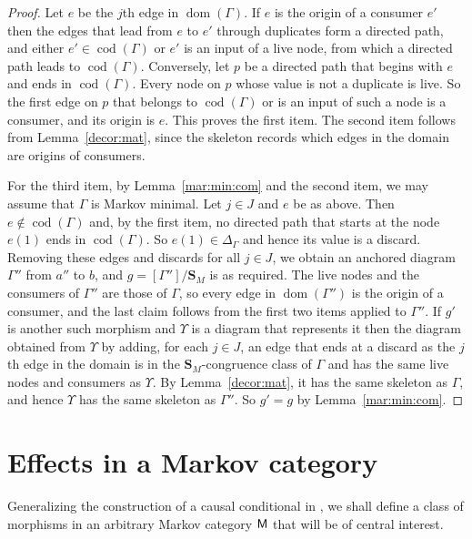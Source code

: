 \documentclass[12pt]{amsart}
\theoremstyle{plain}
\theoremstyle{definition}
\theoremstyle{remark}
\numberwithin{equation}{section}
\theoremstyle{plain}
\DeclareMathOperator{\dom}{dom}
\DeclareMathOperator{\cod}{cod}
\newcommand{\0}{\emptyset}
\newcommand{\cat}[1]{\textup{\textsf{#1}}}
\begin{document}
\begin{proof}
Let $e$ be the $j$th edge in $\dom(\Gamma)$. If $e$ is the origin of a consumer $e'$ then the edges that lead from $e$ to $e'$ through duplicates form a directed path, and either $e' \in \cod(\Gamma)$ or $e'$ is an input of a live node, from which a directed path leads to $\cod(\Gamma)$. Conversely, let $p$ be a directed path that begins with $e$ and ends in $\cod(\Gamma)$. Every node on $p$ whose value is not a duplicate is live. So the first edge on $p$ that belongs to $\cod(\Gamma)$ or is an input of such a node is a consumer, and its origin is $e$. This proves the first item. The second item follows from Lemma~\ref{decor:mat}, since the skeleton records which edges in the domain are origins of consumers.

For the third item, by Lemma~\ref{mar:min:com} and the second item, we may assume that $\Gamma$ is Markov minimal. Let $j \in J$ and $e$ be as above. Then $e \notin \cod(\Gamma)$ and, by the first item, no directed path that starts at the node $e(1)$ ends in $\cod(\Gamma)$. So $e(1) \in \Delta_\Gamma$ and hence its value is a discard. Removing these edges and discards for all $j \in J$, we obtain an anchored diagram $\Gamma''$ from $a''$ to $b$, and $g = [\Gamma''] / \bm S_M$ is as required. The live nodes and the consumers of $\Gamma''$ are those of $\Gamma$, so every edge in $\dom(\Gamma'')$ is the origin of a consumer, and the last claim follows from the first two items applied to $\Gamma''$. If $g'$ is another such morphism and $\Upsilon$ is a diagram that represents it then the diagram obtained from $\Upsilon$ by adding, for each $j \in J$, an edge that ends at a discard as the $j$th edge in the domain is in the $\bm S_M$-congruence class of $\Gamma$ and has the same live nodes and consumers as $\Upsilon$. By Lemma~\ref{decor:mat}, it has the same skeleton as $\Gamma$, and hence $\Upsilon$ has the same skeleton as $\Gamma''$. So $g' = g$ by Lemma~\ref{mar:min:com}.
\end{proof}




\section{Effects in a Markov category}

Generalizing the construction of a causal conditional in \cite[\S~4]{Fong:thesis}, we shall define a class of morphisms in an arbitrary Markov category $\cat M$ that will be of central interest.
\end{document}

